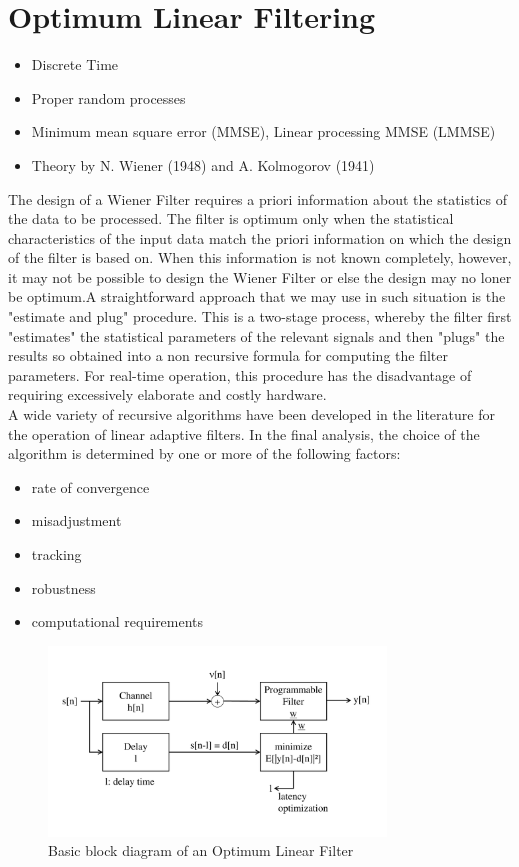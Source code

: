 \section{Optimum Linear Filtering}
\begin{itemize}
	\item Discrete Time
	\item Proper random processes
	\item Minimum mean square error (MMSE), Linear processing MMSE (LMMSE)
	\item Theory by N. Wiener (1948) and A. Kolmogorov (1941)
\end{itemize}
The design of a Wiener Filter requires a priori information about the statistics of the data to be processed. The filter is optimum only when the statistical characteristics of the input data match the priori information on which the design of the filter is based on. When this information is not known completely, however, it may not be possible to design the Wiener Filter or else the design may no loner be optimum.A straightforward approach that we may use in such situation is the "estimate and plug" procedure. This is a two-stage process, whereby the filter first "estimates" the statistical parameters of the relevant signals and then "plugs" the results so obtained into a non recursive formula for computing the filter parameters. For real-time operation, this procedure has the disadvantage of requiring excessively elaborate and costly hardware. \\
A wide variety of recursive algorithms have been developed in the literature for the operation of linear adaptive filters. In the final analysis, the choice of the algorithm is determined by one or more of the following factors: 
\begin{itemize}
	\item rate of convergence
	\item misadjustment
	\item tracking
	\item robustness
	\item computational requirements
\end{itemize}
\begin{figure}[htbp]
	\centering
		\includegraphics[width=0.80\textwidth, trim =1cm 2cm 1cm 2cm,clip ]{graphics/Optimum_filter_block_diagram.pdf}
	\caption{Basic block diagram of an Optimum Linear Filter}
	\label{fig:Optimum_filter_block_diagram}
\end{figure}

